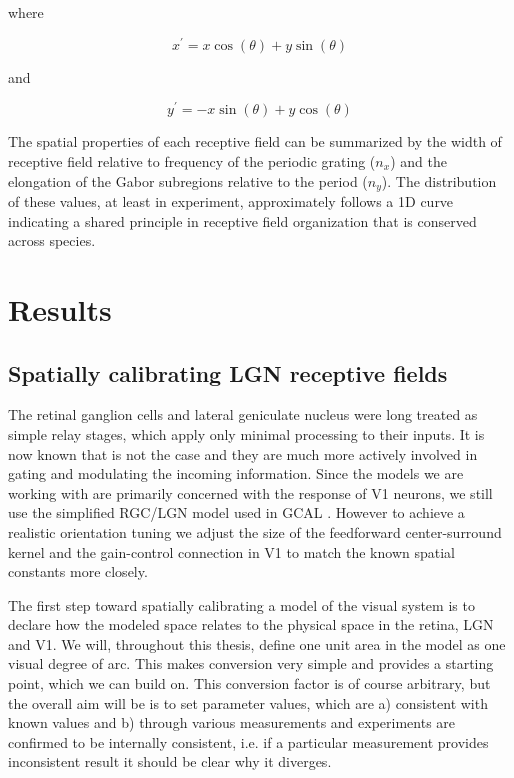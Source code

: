 where

\begin{equation}
  x^\prime = x\cos(\theta) + y\sin(\theta)
\end{equation}

and

\begin{equation}
y^\prime = -x\sin(\theta) + y\cos(\theta)
\end{equation}

The spatial properties of each receptive field can be summarized by
the width of receptive field relative to frequency of the periodic
grating ($n_x$) and the elongation of the Gabor subregions relative to
the period ($n_y$). The distribution of these values, at least in
experiment, approximately follows a 1D curve indicating a shared
principle in receptive field organization that is conserved across
species.

\section{Results}

\subsection{Spatially calibrating LGN receptive fields}

The retinal ganglion cells and lateral geniculate nucleus were long
treated as simple relay stages, which apply only minimal processing to
their inputs. It is now known that is not the case and they are much
more actively involved in gating and modulating the incoming
information. Since the models we are working with are primarily
concerned with the response of V1 neurons, we still use the simplified
RGC/LGN model used in GCAL \citep{Stevens2013}. However to achieve a
realistic orientation tuning we adjust the size of the feedforward
center-surround kernel and the gain-control connection in V1 to match
the known spatial constants more closely.

The first step toward spatially calibrating a model of the visual
system is to declare how the modeled space relates to the physical
space in the retina, LGN and V1. We will, throughout this thesis,
define one unit area in the model as one visual degree of arc. This
makes conversion very simple and provides a starting point, which we
can build on. This conversion factor is of course arbitrary, but the
overall aim will be is to set parameter values, which are a)
consistent with known values and b) through various measurements and
experiments are confirmed to be internally consistent, i.e. if a
particular measurement provides inconsistent result it should be clear
why it diverges.


